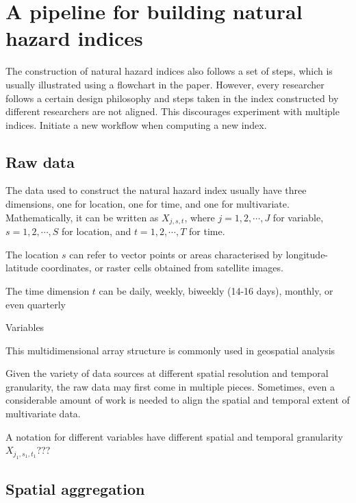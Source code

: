 \documentclass[
]{article}
\begin{document}
\hypertarget{a-pipeline-for-building-natural-hazard-indices}{%
\section{A pipeline for building natural hazard
indices}\label{a-pipeline-for-building-natural-hazard-indices}}

The construction of natural hazard indices also follows a set of steps,
which is usually illustrated using a flowchart in the paper. However,
every researcher follows a certain design philosophy and steps taken in
the index constructed by different researchers are not aligned. This
discourages experiment with multiple indices. Initiate a new workflow
when computing a new index.

\hypertarget{raw-data}{%
\subsection{Raw data}\label{raw-data}}

The data used to construct the natural hazard index usually have three
dimensions, one for location, one for time, and one for multivariate.
Mathematically, it can be written as \(X_{j, s, t}\), where
\(j = 1, 2, \cdots, J\) for variable, \(s = 1, 2, \cdots, S\) for
location, and \(t = 1, 2, \cdots, T\) for time.

The location \(s\) can refer to vector points or areas characterised by
longitude-latitude coordinates, or raster cells obtained from satellite
images.

The time dimension \(t\) can be daily, weekly, biweekly (14-16 days),
monthly, or even quarterly

Variables

This multidimensional array structure is commonly used in geospatial
analysis

Given the variety of data sources at different spatial resolution and
temporal granularity, the raw data may first come in multiple pieces.
Sometimes, even a considerable amount of work is needed to align the
spatial and temporal extent of multivariate data.

A notation for different variables have different spatial and temporal
granularity \(X_{j_1, s_1, t_1}\)???

\hypertarget{spatial-aggregation}{%
\subsection{Spatial aggregation}\label{spatial-aggregation}}
\end{document}
